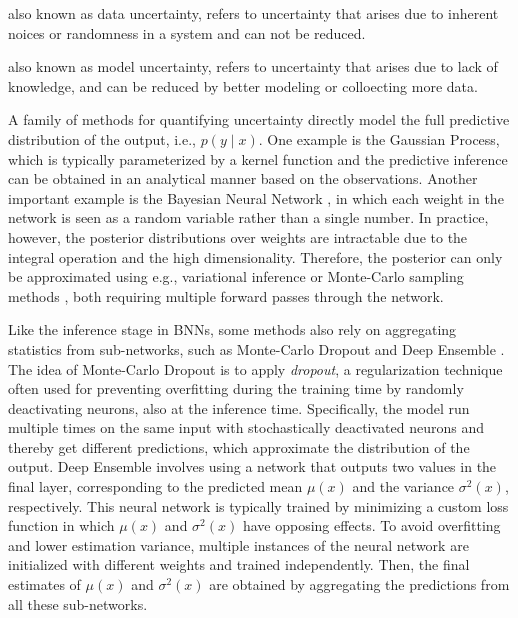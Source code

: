\begin{description}[leftmargin=0cm]
\item[Aleatory Uncertainty:] also known as data uncertainty, refers to uncertainty that arises due to inherent noices or randomness in a system and can not be reduced. \item[Epistemic Uncertainty:] also known as model uncertainty, refers to uncertainty that arises due to lack of knowledge, and can be reduced by better modeling or colloecting more data.
\end{description}

A family of methods for quantifying uncertainty directly model the full predictive distribution of the output, i.e., $p(y \mid x)$. One example is the Gaussian Process, which is typically parameterized by a kernel function and the predictive inference can be obtained in an analytical manner based on the observations. Another important example is the Bayesian Neural Network \cite{kendall2017uncertainties, neal1996bayesian}, in which each weight in the network is seen as a random variable rather than a single number. In practice, however, the posterior distributions over weights are intractable due to the integral operation and the high dimensionality. Therefore, the posterior can only be approximated using e.g.,  variational inference or Monte-Carlo sampling methods \cite{neal1996bayesian, springenberg2016bayesian}, both requiring multiple forward passes through the network. 

Like the inference stage in BNNs, some methods also rely on aggregating statistics from sub-networks, such as Monte-Carlo Dropout \cite{gal2016dropout} and Deep Ensemble \cite{lakshminarayanan2017simple}. The idea of Monte-Carlo Dropout is to apply \textit{dropout}, a regularization technique often used for preventing overfitting during the training time by randomly deactivating neurons, also at the inference time. Specifically, the model run multiple times on the same input with stochastically deactivated neurons and thereby get  different predictions, which approximate the distribution of the output. Deep Ensemble involves using a network that outputs two values in the final layer, corresponding to the predicted mean $\mu(x)$ and the variance $\sigma^2(x)$, respectively. This neural network is typically trained by minimizing a custom loss function in which $\mu(x)$ and $\sigma^2(x)$ have opposing effects. To avoid overfitting and lower estimation variance, multiple instances of the neural network are initialized with different weights and trained independently. Then, the final estimates of $\mu(x)$ and $\sigma^2(x)$ are obtained by aggregating the predictions from all these sub-networks. 

